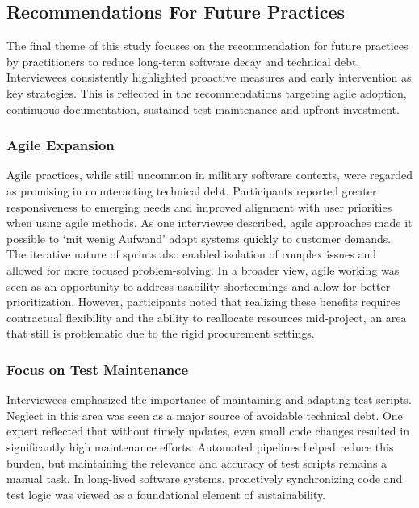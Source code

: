 \subsection{Recommendations For Future Practices}
The final theme of this study focuses on the recommendation for future practices by practitioners to reduce long-term software decay and technical debt. Interviewees consistently highlighted proactive measures and early intervention as key strategies. This is reflected in the recommendations targeting agile adoption, continuous documentation, sustained test maintenance and upfront investment.

\subsubsection{Agile Expansion}
Agile practices, while still uncommon in military software contexts, were regarded as promising in counteracting technical debt. Participants reported greater responsiveness to emerging needs and improved alignment with user priorities when using agile methods.
As one interviewee described, agile approaches made it possible to `mit wenig Aufwand' adapt systems quickly to customer demands. The iterative nature of sprints also enabled isolation of complex issues and allowed for more focused problem-solving.
In a broader view, agile working was seen as an opportunity to address usability shortcomings and allow for better prioritization. However, participants noted that realizing these benefits requires contractual flexibility and the ability to reallocate resources mid-project, an area that still is problematic due to the rigid procurement settings.\\

\subsubsection{Focus on Test Maintenance}
Interviewees emphasized the importance of maintaining and adapting test scripts. Neglect in this area was seen as a major source of avoidable technical debt. One expert reflected that without timely updates, even small code changes resulted in significantly high maintenance efforts.
Automated pipelines helped reduce this burden, but maintaining the relevance and accuracy of test scripts remains a manual task. In long-lived software systems, proactively synchronizing code and test logic was viewed as a foundational element of sustainability.\\


